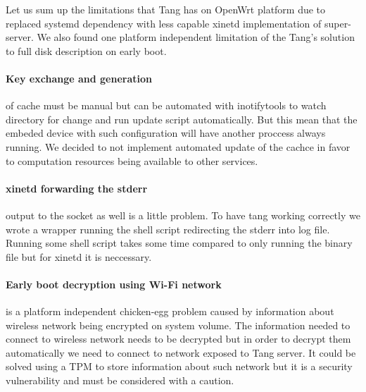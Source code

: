 Let us sum up the limitations that Tang has on OpenWrt platform due to replaced systemd dependency with less capable xinetd implementation of super-server.
We also found one platform independent limitation of the Tang's solution to full disk description on early boot.

\paragraph{Key exchange and generation} of cache must be manual but  can be automated with inotifytools to watch directory for change and run update script automatically.
But this mean that the embeded device with such configuration will have another proccess always running.
We decided to not implement automated update of the cachce in favor to computation resources being available to other services.

\paragraph{xinetd forwarding the stderr} output to the socket as well is a little problem.
To have tang working correctly we wrote a wrapper running the shell script redirecting the stderr into log file.
Running some shell script takes some time compared to only running the binary file but for xinetd it is neccessary.

\paragraph{Early boot decryption using Wi-Fi network} is a platform independent chicken-egg problem caused by information about wireless network being encrypted on system volume.
The information needed to connect to wireless network needs to be decrypted but in order to decrypt them automatically we need to connect to network exposed to Tang server.
It could be solved using a TPM to store information about such network but it is a security vulnerability and must be considered with a caution.
